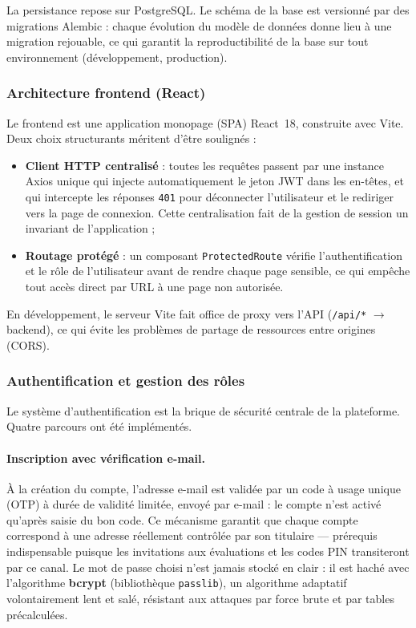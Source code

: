 \documentclass[12pt,a4paper]{report}
\begin{document}
La persistance repose sur PostgreSQL. Le schéma de la base est versionné par des migrations Alembic : chaque évolution du modèle de données donne lieu à une migration rejouable, ce qui garantit la reproductibilité de la base sur tout environnement (développement, production).

\subsubsection{Architecture frontend (React)}

Le frontend est une application monopage (SPA) React~18, construite avec Vite. Deux choix structurants méritent d'être soulignés :

\begin{itemize}
  \item \textbf{Client HTTP centralisé} : toutes les requêtes passent par une instance Axios unique qui injecte automatiquement le jeton JWT dans les en-têtes, et qui intercepte les réponses \texttt{401} pour déconnecter l'utilisateur et le rediriger vers la page de connexion. Cette centralisation fait de la gestion de session un invariant de l'application ;
  \item \textbf{Routage protégé} : un composant \texttt{ProtectedRoute} vérifie l'authentification et le rôle de l'utilisateur avant de rendre chaque page sensible, ce qui empêche tout accès direct par URL à une page non autorisée.
\end{itemize}

En développement, le serveur Vite fait office de proxy vers l'API (\texttt{/api/*} $\rightarrow$ backend), ce qui évite les problèmes de partage de ressources entre origines (CORS).

\subsubsection{Authentification et gestion des rôles}

Le système d'authentification est la brique de sécurité centrale de la plateforme. Quatre parcours ont été implémentés.

\paragraph{Inscription avec vérification e-mail.} À la création du compte, l'adresse e-mail est validée par un code à usage unique (OTP) à durée de validité limitée, envoyé par e-mail : le compte n'est activé qu'après saisie du bon code. Ce mécanisme garantit que chaque compte correspond à une adresse réellement contrôlée par son titulaire --- prérequis indispensable puisque les invitations aux évaluations et les codes PIN transiteront par ce canal. Le mot de passe choisi n'est jamais stocké en clair : il est haché avec l'algorithme \textbf{bcrypt} (bibliothèque \texttt{passlib}), un algorithme adaptatif volontairement lent et salé, résistant aux attaques par force brute et par tables précalculées.
\end{document}
